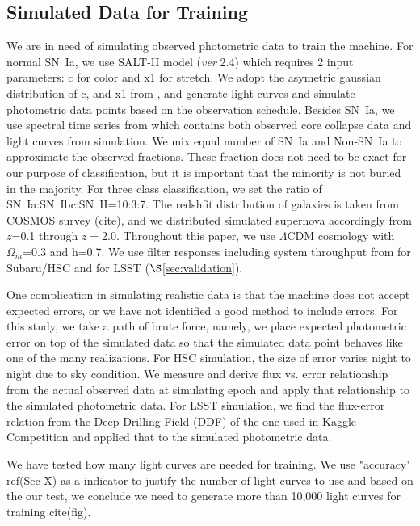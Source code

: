 \documentclass[useamsfonts]{pasj01}
\begin{document}
\subsection{Simulated Data for Training}
\label{sec:training}
We are in need of simulating observed photometric data to train the machine.  
For normal SN~Ia, we use SALT-II \citep{guy10a} model ({\it ver} 2.4) which requires 2 input parameters:
c for color and x1 for stretch.
We adopt the asymetric gaussian distribution of c, and x1 from \citet{mosher14a}, and generate
light curves and simulate photometric data points based on the observation schedule. 
Besides SN~Ia, we use spectral time series from \citet{kessler19b} which contains both observed
core collapse data and light curves from simulation.
We mix equal number of SN~Ia and Non-SN~Ia to approximate the observed fractions. 
These fraction does not need to be exact for our purpose of classification, but it is important
that the minority is not buried in the majority.
For three class classification, we set the ratio of SN~Ia:SN~Ibc:SN~II=10:3:7.
The redshfit distribution of galaxies is taken from COSMOS survey (cite), and we distributed
simulated supernova accordingly from $z$=0.1 through $z=$2.0.
Throughout this paper, we use $\Lambda$CDM cosmology with $\Omega_{m}$=0.3 and h=0.7.
We use filter responses including system throughput from \citet{kawanomoto18a} for Subaru/HSC and
\citet{ivezic19a} for LSST ($\S$\ref{sec:validation}). 

One complication in simulating realistic data is that the machine does not accept expected errors,
or we have not identified a good method to include errors.   
For this study, we take a path of brute force, namely, we place expected photometric error on top 
of the simulated data so that the simulated data point behaves like one of the many realizations.
For HSC simulation, the size of error varies night to night due to sky condition. 
We measure and derive flux vs. error relationship from the actual observed data at simulating epoch 
and apply that relationship to the simulated photometric data.
For LSST simulation, we find the flux-error relation from the Deep Drilling Field (DDF) of the one
used in Kaggle Competition \citep{malz19a} and applied that to the simulated photometric data.

We have tested how many light curves are needed for training.  We use "accuracy" ref(Sec X) as a indicator to justify the number of light curves to use and based on the our test, we conclude we need to generate more than 10,000 light curves for training cite(fig).
\end{document}
